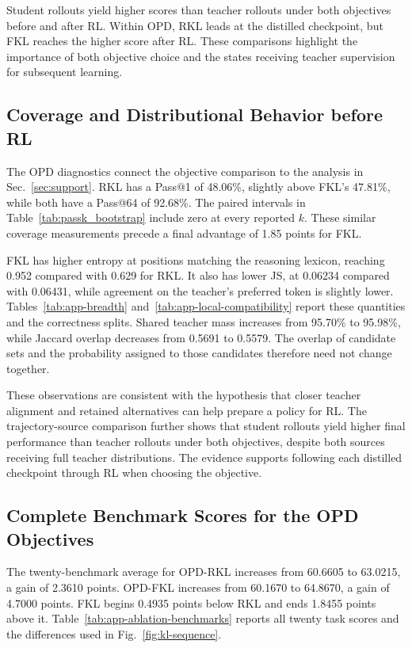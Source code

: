 \documentclass[]{jingdong}
\theoremstyle{plain}
\theoremstyle{definition}
\theoremstyle{remark}
\begin{document}
Student rollouts yield higher scores than teacher rollouts under both objectives before and after RL. Within OPD, RKL leads at the distilled checkpoint, but FKL reaches the higher score after RL. These comparisons highlight the importance of both objective choice and the states receiving teacher supervision for subsequent learning.

\subsection{Coverage and Distributional Behavior before RL}
\label{app:token-support}

The OPD diagnostics connect the objective comparison to the analysis in Sec.~\ref{sec:support}. RKL has a Pass@1 of 48.06\%, slightly above FKL's 47.81\%, while both have a Pass@64 of 92.68\%. The paired intervals in Table~\ref{tab:passk_bootstrap} include zero at every reported $k$. These similar coverage measurements precede a final advantage of 1.85 points for FKL.

FKL has higher entropy at positions matching the reasoning lexicon, reaching 0.952 compared with 0.629 for RKL. It also has lower JS, at 0.06234 compared with 0.06431, while agreement on the teacher's preferred token is slightly lower. Tables~\ref{tab:app-breadth} and~\ref{tab:app-local-compatibility} report these quantities and the correctness splits. Shared teacher mass increases from 95.70\% to 95.98\%, while Jaccard overlap decreases from 0.5691 to 0.5579. The overlap of candidate sets and the probability assigned to those candidates therefore need not change together.

These observations are consistent with the hypothesis that closer teacher alignment and retained alternatives can help prepare a policy for RL. The trajectory-source comparison further shows that student rollouts yield higher final performance than teacher rollouts under both objectives, despite both sources receiving full teacher distributions. The evidence supports following each distilled checkpoint through RL when choosing the objective.

\clearpage
\subsection{Complete Benchmark Scores for the OPD Objectives}

The twenty-benchmark average for OPD-RKL increases from 60.6605 to 63.0215, a gain of 2.3610 points. OPD-FKL increases from 60.1670 to 64.8670, a gain of 4.7000 points. FKL begins 0.4935 points below RKL and ends 1.8455 points above it. Table~\ref{tab:app-ablation-benchmarks} reports all twenty task scores and the differences used in Fig.~\ref{fig:kl-sequence}.
\end{document}
